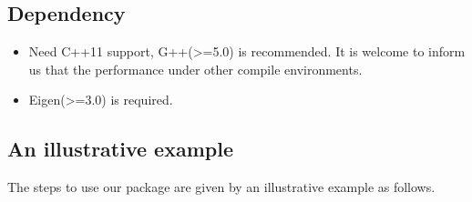 \documentclass[a4paper]{article}
\begin{document}
  \subsection{Dependency}
  \begin{itemize}
    \item Need C++11 support, G++(>=5.0) is recommended. It is 
    welcome to inform us that the performance under other compile 
    environments.
    \item Eigen(>=3.0) is required.
  \end{itemize}

  \subsection{An illustrative example}
  The steps to use our package are given by an illustrative example 
  as follows.
\end{document}
